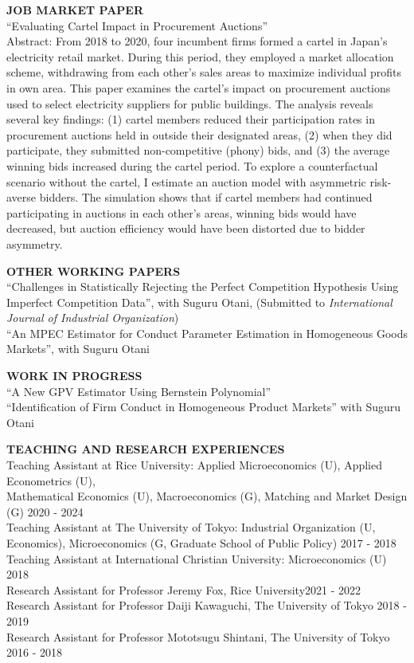 \documentclass[10pt]{article}
\begin{document}
\textbf{JOB MARKET PAPER}\\
“Evaluating Cartel Impact in Procurement Auctions”\\
Abstract: From 2018 to 2020, four incumbent firms formed a cartel in Japan's electricity retail market. During this period, they employed a market allocation scheme, withdrawing from each other's sales areas to maximize individual profits in own area. 
This paper examines the cartel's impact on procurement auctions used to select electricity suppliers for public buildings.
The analysis reveals several key findings: (1) cartel members reduced their participation rates in procurement auctions held in outside their designated areas, (2) when they did participate, they submitted non-competitive (phony) bids, and (3) the average winning bids increased during the cartel period.   
To explore a counterfactual scenario without the cartel, I estimate an auction model with asymmetric risk-averse bidders. 
The simulation shows that if cartel members had continued participating in auctions in each other's areas, winning bids would have decreased, but auction efficiency would have been distorted due to bidder asymmetry.

\vspace{10pt}

\textbf{OTHER WORKING PAPERS} \\
“Challenges in Statistically Rejecting the Perfect Competition Hypothesis Using Imperfect Competition Data”, with Suguru Otani, (Submitted to \textit{International Journal of Industrial Organization}) \\
“An MPEC Estimator for Conduct Parameter Estimation in Homogeneous Goods Markets”, with Suguru Otani

\vspace{10pt}

\textbf{WORK IN PROGRESS} \\
“A New GPV Estimator Using Bernstein Polynomial” \\
“Identification of Firm Conduct in Homogeneous Product Markets” with Suguru Otani

\vspace{10pt}

\textbf{TEACHING AND RESEARCH EXPERIENCES} \\
Teaching Assistant at Rice University: Applied Microeconomics (U), Applied Econometrics (U),\\
Mathematical Economics (U), Macroeconomics (G), Matching and Market Design (G) \hfill 2020 - 2024\\
Teaching Assistant at The University of Tokyo: Industrial Organization (U, Economics), Microeconomics (G, Graduate School of Public Policy) \hfill  2017 - 2018\\
Teaching Assistant at International Christian University: Microeconomics (U) \hfill 2018\\
Research Assistant for Professor Jeremy Fox, Rice University\hfill 2021 - 2022\\
Research Assistant for Professor Daiji Kawaguchi, The University of Tokyo \hfill 2018 - 2019\\
Research Assistant for Professor Mototsugu Shintani, The University of Tokyo \hfill 2016 - 2018
\end{document}
